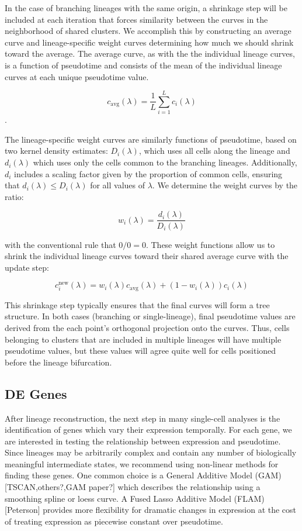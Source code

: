 \documentclass[11pt]{article}\usepackage[]{graphicx}\usepackage[]{color}
\begin{document}
In the case of branching lineages with the same origin, a shrinkage step will be included at each iteration that forces similarity between the curves in the neighborhood of shared clusters. We accomplish this by constructing an average curve and lineage-specific weight curves determining how much we should shrink toward the average. The average curve, as with the the individual lineage curves, is a function of pseudotime and consists of the mean of the individual lineage curves at each unique pseudotime value.

$$c_{\text{avg}}(\lambda) = \frac{1}{L}\sum_{i=1}^{L}{c_i(\lambda)}$$.

The lineage-specific weight curves are similarly functions of pseudotime, based on two kernel density estimates: $D_i(\lambda)$, which uses all cells along the lineage and $d_i(\lambda)$ which uses only the cells common to the branching lineages. Additionally, $d_i$ includes a scaling factor given by the proportion of common cells, ensuring that $d_i(\lambda) \leq D_i(\lambda)$ for all values of $\lambda$. We determine the weight curves by the ratio:

$$w_i(\lambda) = \frac{d_i(\lambda)}{D_i(\lambda)}$$

with the conventional rule that $0/0 = 0$. These weight functions allow us to shrink the individual lineage curves toward their shared average curve with the update step:

$$c_i^\text{new}(\lambda) = w_i(\lambda)c_{\text{avg}}(\lambda) + (1-w_i(\lambda))c_i(\lambda)$$

This shrinkage step typically ensures that the final curves will form a tree structure. In both cases (branching or single-lineage), final pseudotime values are derived from the each point’s orthogonal projection onto the curves. Thus, cells belonging to clusters that are included in multiple lineages will have multiple pseudotime values, but these values will agree quite well for cells positioned before the lineage bifurcation.


\subsection{DE Genes}
After lineage reconstruction, the next step in many single-cell analyses is the identification of genes which vary their expression temporally. For each gene, we are interested in testing the relationship between expression and pseudotime. Since lineages may be arbitrarily complex and contain any number of biologically meaningful intermediate states, we recommend using non-linear methods for finding these genes. One common choice is a General Additive Model (GAM) [TSCAN,others?,GAM paper?] which describes the relationship using a smoothing spline or loess curve. A Fused Lasso Additive Model (FLAM) [Peterson] provides more flexibility for dramatic changes in expression at the cost of treating expression as piecewise constant over pseudotime.
\end{document}
